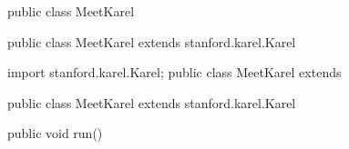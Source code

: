 \begin{sloppypar}
\begin{lstcodesimple}[language = Java, float]
    public class MeetKarel{
            
    }
\end{lstcodesimple}

\begin{lstcodesimple}[language = Java, float=hb]
    public class MeetKarel extends stanford.karel.Karel{
            
    }
\end{lstcodesimple}

\begin{lstcodesimple}[language = Java, float]
    import stanford.karel.Karel;
    public class MeetKarel extends {
            
    }
\end{lstcodesimple}

\begin{lstcodesimple}[language = Java, float]
    public class MeetKarel extends stanford.karel.Karel{
            public void run(){

            }            
    }
\end{lstcodesimple}

\end{sloppypar}
